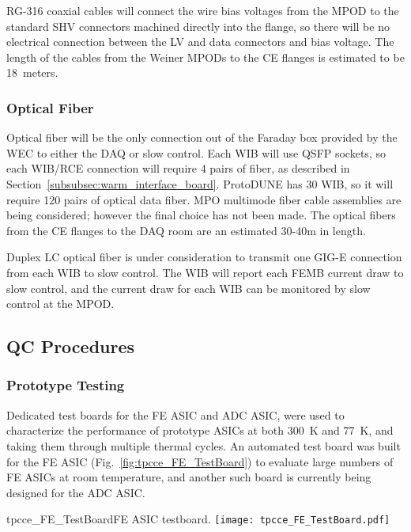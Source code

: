 RG-316 coaxial cables will connect the wire bias voltages from the MPOD to the standard SHV
connectors machined directly into the flange, so there will be no electrical connection between 
the LV and data connectors and bias voltage. The length of the cables from the Weiner MPODs
to the CE flanges is estimated to be 18~meters.

%
\subsubsection{Optical Fiber}
\label{subsubsec:ce_optical_fiber}

Optical fiber will be the only connection out of the Faraday box provided by the WEC to either 
the DAQ or slow control. Each WIB will use QSFP sockets, so each WIB/RCE connection will require 
4 pairs of fiber, as described in Section~\ref{subsubsec:warm_interface_board}.  ProtoDUNE has 
30 WIB, so it will require 120 pairs of optical data fiber. MPO multimode fiber cable assemblies 
are being considered; however the final choice has not been made. The optical fibers from
the CE flanges to the DAQ room are an estimated 30-40m in length.

Duplex LC optical fiber is under consideration to transmit one GIG-E connection from each
WIB to slow control. The WIB will report each FEMB current draw to slow control, and the 
current draw for each WIB can be monitored by slow control at the MPOD.

\subsection{QC Procedures}

\subsubsection{Prototype Testing}
\label{subsubsec:ce_install_proto}

Dedicated test boards for the FE ASIC and ADC ASIC,
were used to characterize the performance of prototype ASICs at both 300~K and 77~K,
and taking them through multiple thermal cycles.
An automated test board was built for the FE ASIC (Fig.~\ref{fig:tpcce_FE_TestBoard})
to evaluate large numbers of FE ASICs at room temperature,
and another such board is currently being designed for the ADC ASIC.

\begin{cdrfigure}{tpcce_FE_TestBoard}{FE ASIC testboard.}
\texttt{[image: tpcce\_FE\_TestBoard.pdf]}
\end{cdrfigure}

